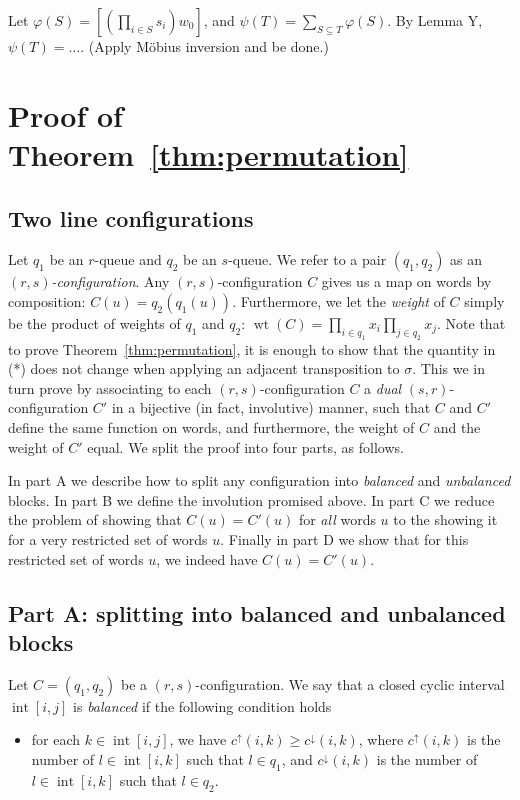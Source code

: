 \documentclass[reqno]{amsart}
\newcommand{\0}{\phantom{c}}
\DeclareMathOperator{\inter}{int} %
\DeclareMathOperator{\wt}{wt} %
\let\sumnonlimits\sum
\let\prodnonlimits\prod
\renewcommand{\sum}{\sumnonlimits\limits}
\renewcommand{\prod}{\prodnonlimits\limits}
\newcommand{\defn}[1]{{\color{darkred}\emph{#1}}} %
\theoremstyle{plain}
\theoremstyle{definition}
\numberwithin{equation}{section}
\begin{document}
Let $\varphi(S) = \left[ ( \prod_{i\in S} s_i ) w_0 \right]$, and $\psi(T) = \sum_{S \subseteq T} \varphi(S)$. By Lemma Y, $\psi(T) = \dots$. (Apply M\"obius inversion and be done.)








\section{Proof of Theorem~\ref{thm:permutation}}
\subsection{Two line configurations}

Let $q_1$ be an $r$-queue and $q_2$ be an $s$-queue.
We refer to a pair $(q_1, q_2)$ as an \defn{$(r,s)$-configuration}.
Any $(r,s)$-configuration $C$ gives us a map on words by composition: $C(u) = q_2(q_1(u))$.
Furthermore, we let the \defn{weight} of $C$ simply be the product of weights of $q_1$ and $q_2$: $\wt(C)=\prod_{i\in q_1}x_i\prod_{j\in q_2}x_j$.
Note that to prove Theorem~\ref{thm:permutation}, it is enough to show that the quantity in (*) does not change when applying an adjacent transposition to $\sigma$.
This we in turn prove by associating to each $(r,s)$-configuration $C$ a \defn{dual} $(s,r)$-configuration $C'$ in a bijective (in fact, involutive) manner, such that $C$ and $C'$ define the same function on words, and furthermore, the weight of $C$ and the weight of $C'$ equal. We split the proof into four parts, as follows.

In part A we describe how to split any configuration into \defn{balanced} and \defn{unbalanced} blocks. In part B we define the involution promised above. In part C we reduce the problem of showing that $C(u) = C'(u)$ for \emph{all} words $u$ to the showing it for a very restricted set of words $u$. Finally in part D we show that for this restricted set of words $u$, we indeed have $C(u) = C'(u)$.

\subsection{Part A: splitting into balanced and unbalanced blocks}

Let $C=(q_1,q_2)$ be a $(r,s)$-configuration. We say that a closed cyclic interval $\inter[i,j]$ is \defn{balanced} if the following condition holds
\begin{itemize}
  \item for each $k \in \inter[i,j]$, we have $c^\uparrow(i,k) \geq c^\downarrow(i,k)$, where $c^{\uparrow}(i,k)$ is the number of $l \in \inter[i,k]$ such that $l \in q_1$, and $c^\downarrow(i,k)$ is the number of $l\in\inter[i,k]$ such that $l\in q_2$.
\end{itemize}
\end{document}

